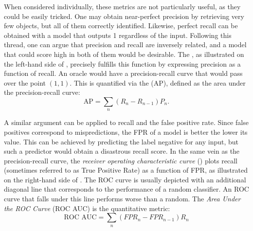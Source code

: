 When considered individually, these metrics are not particularly useful, as they could be easily tricked. One may obtain near-perfect precision by retrieving very few objects, but all of them correctly identified. Likewise, perfect recall can be obtained with a model that outputs 1 regardless of the input. Following this thread, one can argue that precision and recall are inversely related, and a model that could score high in both of them would be desirable. The \textit{}, as illustrated on the left-hand side of , precisely fulfills this function by expressing precision as a function of recall. An oracle would have a precision-recall curve that would pass over the point $(1,1)$. This is quantified via the \textit{} (AP), defined as the area under the precision-recall curve:
\begin{equation*}
    \text{AP} = \sum_n (R_n - R_{n-1})P_n.
\end{equation*}


A similar argument can be applied to recall and the false positive rate. Since false positives correspond to mispredictions, the FPR of a model is better the lower its value. This can be achieved by predicting the label negative for any input, but such a predictor would obtain a disastrous recall score. In the same vein as the precision-recall curve, the \textit{receiver operating characteristic curve} (\textit{}) plots recall (sometimes referred to as True Positive Rate) as a function of FPR, as illustrated on the right-hand side of . The ROC curve is usually depicted with an additional diagonal line that corresponds to the performance of a random classifier. An ROC curve that falls under this line performs worse than a random. The \textit{Area Under the ROC Curve} (ROC AUC) is the quantitative metric:
\begin{equation*}
    \text{ROC AUC} = \sum_n (FPR_n - FPR_{n-1})R_n
\end{equation*}

